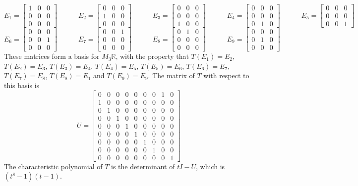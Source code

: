 \documentclass{amsart}
\newcommand{\R}         {{\mathbb{R}}}
\newcommand{\bpm}       {\left[\begin{matrix}}
\newcommand{\epm}       {\end{matrix}\right]}
\renewcommand{\:}{\colon}
\theoremstyle{definition}
\newenvironment{solution}{{\noindent \bf Solution:}}{}
\begin{document}
\begin{solution}
 {\tiny \[
  E_1 = \bpm 1&0&0\\0&0&0\\0&0&0\epm \hspace{3em}
  E_2 = \bpm 0&0&0\\1&0&0\\0&0&0\epm \hspace{3em}
  E_3 = \bpm 0&0&0\\0&0&0\\1&0&0\epm \hspace{3em}
  E_4 = \bpm 0&0&0\\0&0&0\\0&1&0\epm \hspace{3em}
  E_5 = \bpm 0&0&0\\0&0&0\\0&0&1\epm 
 \] \[
  E_6 = \bpm 0&0&0\\0&0&1\\0&0&0\epm \hspace{3em}
  E_7 = \bpm 0&0&1\\0&0&0\\0&0&0\epm \hspace{3em}
  E_8 = \bpm 0&1&0\\0&0&0\\0&0&0\epm \hspace{3em}
  E_9 = \bpm 0&0&0\\0&1&0\\0&0&0\epm  
 \]}
 These matrices form a basis for $M_3\R$, with the property
 that
 $T(E_1)=E_2$, 
 $T(E_2)=E_3$, 
 $T(E_3)=E_4$, 
 $T(E_4)=E_5$, 
 $T(E_5)=E_6$, 
 $T(E_6)=E_7$, 
 $T(E_7)=E_8$, 
 $T(E_8)=E_1$ and 
 $T(E_9)=E_9$.  The matrix of $T$ with respect to this basis
 is 
 {\tiny \[ U = \bpm 
     0 & 0 & 0 & 0 & 0 & 0 & 0 & 1 & 0 \\
     1 & 0 & 0 & 0 & 0 & 0 & 0 & 0 & 0 \\
     0 & 1 & 0 & 0 & 0 & 0 & 0 & 0 & 0 \\
     0 & 0 & 1 & 0 & 0 & 0 & 0 & 0 & 0 \\
     0 & 0 & 0 & 1 & 0 & 0 & 0 & 0 & 0 \\
     0 & 0 & 0 & 0 & 1 & 0 & 0 & 0 & 0 \\
     0 & 0 & 0 & 0 & 0 & 1 & 0 & 0 & 0 \\
     0 & 0 & 0 & 0 & 0 & 0 & 1 & 0 & 0 \\
     0 & 0 & 0 & 0 & 0 & 0 & 0 & 0 & 1 
    \epm
 \]}
 The characteristic polynomial of $T$ is the determinant of
 $tI-U$, which is $(t^8-1)(t-1)$.
\end{solution}
\end{document}
